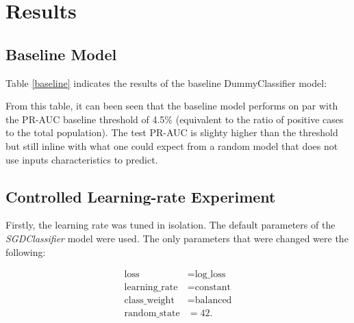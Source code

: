 \section{Results}\label{results}

\subsection{Baseline Model}\label{baseline_model}

Table \ref{baseline} indicates the results of the baseline DummyClassifier model:

\begin{table}[htbp]
\caption{Baseline Model Results}
\centering
{}
\label{baseline}
\end{table}

From this table, it can been seen that the baseline model performs on par with the PR-AUC baseline threshold of 4.5\% (equivalent to the ratio of positive cases to the total population). 
The test PR-AUC is slighty higher than the threshold but still inline with what one could expect from a random model that does not use inputs characteristics to predict.

\subsection{Controlled Learning-rate Experiment}\label{controlled_learningrate_section}

Firstly, the learning rate was tuned in isolation. The default parameters of the \emph{SGDClassifier} model were used. The only parameters that were changed were the following:

\[
\begin{aligned}
\text{loss} &= \text{log\_loss} \\
\text{learning\_rate} &= \text{constant} \\
\text{class\_weight} &= \text{balanced} \\
\text{random\_state} &= 42.
\end{aligned}
\]

